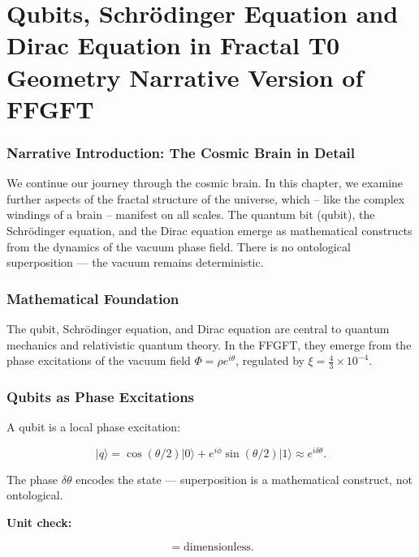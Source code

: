 \chapter{Qubits, Schrödinger Equation and Dirac Equation in Fractal T0 Geometry  Narrative Version of FFGFT}


	
	\subsection*{Narrative Introduction: The Cosmic Brain in Detail}
	
	We continue our journey through the cosmic brain. In this chapter, we examine further aspects of the fractal structure of the universe, which – like the complex windings of a brain – manifest on all scales. The quantum bit (qubit), the Schrödinger equation, and the Dirac equation emerge as mathematical constructs from the dynamics of the vacuum phase field. There is no ontological superposition — the vacuum remains deterministic.
	
	\subsection*{Mathematical Foundation}
	
	The qubit, Schrödinger equation, and Dirac equation are central to quantum mechanics and relativistic quantum theory. In the FFGFT, they emerge from the phase excitations of the vacuum field \(\Phi = \rho e^{i\theta}\), regulated by \(\xi = \frac{4}{3} \times 10^{-4}\).
	
	\subsection*{Qubits as Phase Excitations}
	
	A qubit is a local phase excitation:
	
	\begin{equation}
		|q\rangle = \cos(\theta/2) |0\rangle + e^{i\phi} \sin(\theta/2) |1\rangle \approx e^{i \delta \theta}.
	\end{equation}
	
	The phase \(\delta \theta\) encodes the state — superposition is a mathematical construct, not ontological.
	
	\textbf{Unit check:}
	
	\begin{equation}
		[\delta \theta] = \text{dimensionless}.
	\end{equation}
	
